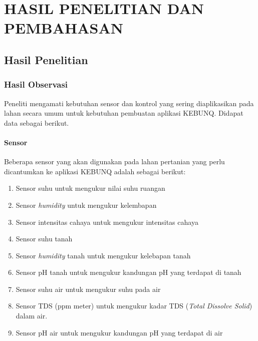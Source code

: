 \chapter{HASIL PENELITIAN DAN PEMBAHASAN}

%
\vspace{4.5pt}
\begin{flushleft}
    \begin{justify}
        \section{Hasil Penelitian}
        \subsection{Hasil Observasi}
        Peneliti mengamati kebutuhan sensor dan kontrol yang sering diaplikasikan pada lahan secara umum untuk kebutuhan pembuatan aplikasi KEBUNQ. Didapat data sebagai berikut.\\
        \subsubsection{Sensor} 
        Beberapa sensor yang akan digunakan pada lahan pertanian yang perlu dicantumkan ke aplikasi KEBUNQ adalah sebagai berikut:
        \begin{enumerate}
            \item Sensor suhu untuk mengukur nilai suhu ruangan
            \item Sensor \emph{humidity} untuk mengukur kelembapan
            \item Sensor intensitas cahaya untuk mengukur intensitas cahaya
            \item Sensor suhu tanah
            \item Sensor \emph{humidity} tanah untuk mengukur kelebapan tanah
            \item Sensor pH tanah untuk mengukur kandungan pH yang terdapat di tanah
            \item Sensor suhu air untuk mengukur suhu pada air
            \item Sensor TDS (ppm meter) untuk mengukur kadar TDS (\emph{Total Dissolve Solid}) dalam air.
            \item Sensor pH air untuk mengukur kandungan pH yang terdapat di air\\
        \end{enumerate}

\end{justify}
\end{flushleft}
